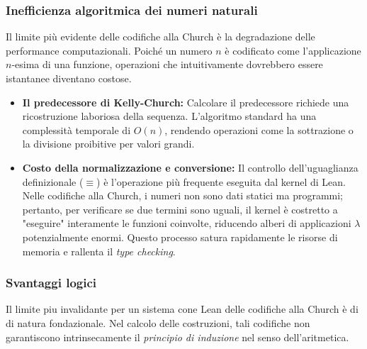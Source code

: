 \subsubsection{Inefficienza algoritmica dei numeri naturali}
Il limite più evidente delle codifiche alla Church è la degradazione delle performance computazionali. Poiché un numero $n$ è codificato come 
l'applicazione $n$-esima di una funzione, operazioni che intuitivamente dovrebbero essere istantanee diventano costose.

\begin{itemize}
    \item 
        \textbf{Il predecessore di Kelly-Church:} 
        Calcolare il predecessore richiede una ricostruzione laboriosa della sequenza. L'algoritmo standard ha una complessità 
        temporale di $O(n)$, rendendo operazioni come la sottrazione o la divisione proibitive per valori grandi.
    \item 
        \textbf{Costo della normalizzazione e conversione:}
        Il controllo dell'uguaglianza definizionale ($\equiv$) è l'operazione più frequente eseguita dal kernel di Lean. Nelle codifiche 
        alla Church, i numeri non sono dati statici ma programmi; pertanto, per verificare se due termini sono uguali, il kernel è costretto 
        a "eseguire" interamente le funzioni coinvolte, riducendo alberi di applicazioni $\lambda$ potenzialmente enormi. Questo processo 
        satura rapidamente le risorse di memoria e rallenta il \emph{type checking}.
\end{itemize}

\subsubsection{Svantaggi logici}
Il limite piu invalidante per un sistema cone Lean delle codifiche alla Church è di di natura fondazionale. Nel calcolo delle costruzioni, tali
codifiche non garantiscono intrinsecamente il \emph{principio di induzione} nel senso dell'aritmetica.

